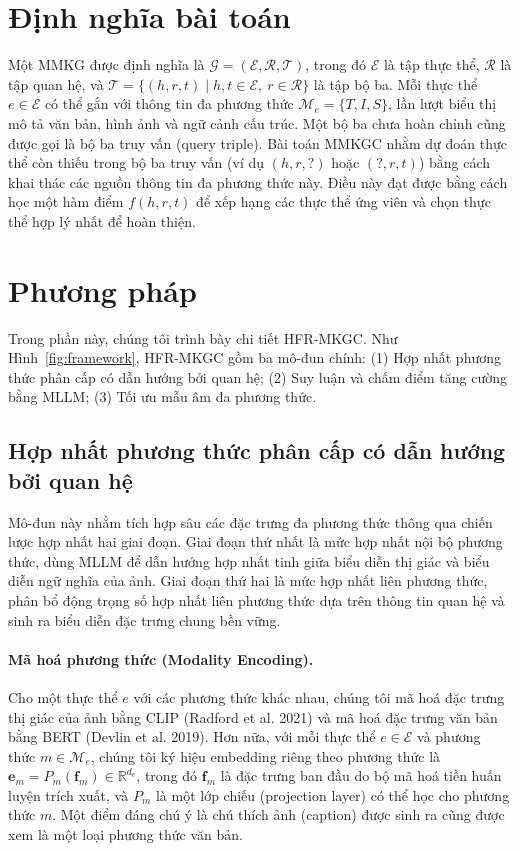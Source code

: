 \documentclass[10pt,twocolumn,a4paper]{article}
\begin{document}
\section{Định nghĩa bài toán}

Một MMKG được định nghĩa là $\mathcal{G} = (\mathcal{E}, \mathcal{R}, \mathcal{T})$, trong đó $\mathcal{E}$ là tập thực thể, $\mathcal{R}$ là tập quan hệ, và $\mathcal{T} = \{(h, r, t) \mid h, t \in \mathcal{E},\ r \in \mathcal{R}\}$ là tập bộ ba. Mỗi thực thể $e \in \mathcal{E}$ có thể gắn với thông tin đa phương thức $\mathcal{M}_e = \{T, I, S\}$, lần lượt biểu thị mô tả văn bản, hình ảnh và ngữ cảnh cấu trúc. Một bộ ba chưa hoàn chỉnh cũng được gọi là bộ ba truy vấn (query triple). Bài toán MMKGC nhằm dự đoán thực thể còn thiếu trong bộ ba truy vấn (ví dụ $(h, r, ?)$ hoặc $(?, r, t)$) bằng cách khai thác các nguồn thông tin đa phương thức này. Điều này đạt được bằng cách học một hàm điểm $f(h, r, t)$ để xếp hạng các thực thể ứng viên và chọn thực thể hợp lý nhất để hoàn thiện.

\section{Phương pháp}

Trong phần này, chúng tôi trình bày chi tiết HFR-MKGC. Như Hình~\ref{fig:framework}, HFR-MKGC gồm ba mô-đun chính: (1) Hợp nhất phương thức phân cấp có dẫn hướng bởi quan hệ; (2) Suy luận và chấm điểm tăng cường bằng MLLM; (3) Tối ưu mẫu âm đa phương thức.

\subsection{Hợp nhất phương thức phân cấp có dẫn hướng bởi quan hệ}

Mô-đun này nhằm tích hợp sâu các đặc trưng đa phương thức thông qua chiến lược hợp nhất hai giai đoạn. Giai đoạn thứ nhất là mức hợp nhất nội bộ phương thức, dùng MLLM để dẫn hướng hợp nhất tinh giữa biểu diễn thị giác và biểu diễn ngữ nghĩa của ảnh. Giai đoạn thứ hai là mức hợp nhất liên phương thức, phân bổ động trọng số hợp nhất liên phương thức dựa trên thông tin quan hệ và sinh ra biểu diễn đặc trưng chung bền vững.

\paragraph{Mã hoá phương thức (Modality Encoding).}
Cho một thực thể $e$ với các phương thức khác nhau, chúng tôi mã hoá đặc trưng thị giác của ảnh bằng CLIP (Radford et al. 2021) và mã hoá đặc trưng văn bản bằng BERT (Devlin et al. 2019). Hơn nữa, với mỗi thực thể $e \in \mathcal{E}$ và phương thức $m \in \mathcal{M}_e$, chúng tôi ký hiệu embedding riêng theo phương thức là $\mathbf{e}_m = P_m(\mathbf{f}_m) \in \mathbb{R}^{d_e}$, trong đó $\mathbf{f}_m$ là đặc trưng ban đầu do bộ mã hoá tiền huấn luyện trích xuất, và $P_m$ là một lớp chiếu (projection layer) có thể học cho phương thức $m$. Một điểm đáng chú ý là chú thích ảnh (caption) được sinh ra cũng được xem là một loại phương thức văn bản.
\end{document}
